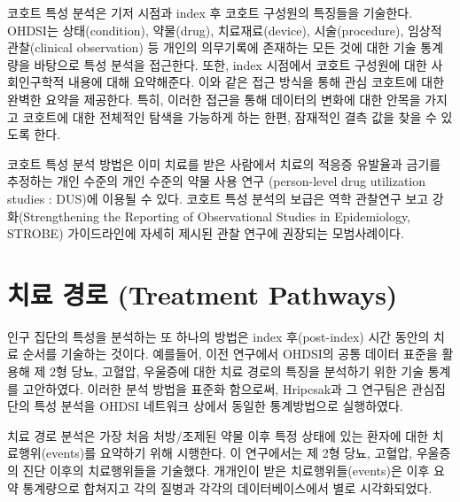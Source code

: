 \documentclass[11pt]{book}
\theoremstyle{definition}
\theoremstyle{definition}
\theoremstyle{definition}
\theoremstyle{remark}
\begin{document}
코호트 특성 분석은 기저 시점과 index 후 코호트 구성원의 특징들을
기술한다. OHDSI는 상태(condition), 약물(drug), 치료재료(device),
시술(procedure), 임상적 관찰(clinical observation) 등 개인의 의무기록에
존재하는 모든 것에 대한 기술 통계량을 바탕으로 특성 분석을 접근한다.
또한, index 시점에서 코호트 구성원에 대한 사회인구학적 내용에 대해
요약해준다. 이와 같은 접근 방식을 통해 관심 코호트에 대한 완벽한 요약을
제공한다. 특히, 이러한 접근을 통해 데이터의 변화에 대한 안목을 가지고
코호트에 대한 전체적인 탐색을 가능하게 하는 한편, 잠재적인 결측 값을
찾을 수 있도록 한다.

코호트 특성 분석 방법은 이미 치료를 받은 사람에서 치료의 적응증 유발율과
금기를 추정하는 개인 수준의 개인 수준의 약물 사용 연구 (person-level
drug utilization studies : DUS)에 이용될 수 있다. 코호트 특성 분석의
보급은 역학 관찰연구 보고 강화(Strengthening the Reporting of
Observational Studies in Epidemiology, STROBE) 가이드라인에 자세히
제시된 관찰 연구에 권장되는 모범사례이다. \citep{VONELM2008344}

\section{치료 경로 (Treatment Pathways)}\label{--treatment-pathways}

인구 집단의 특성을 분석하는 또 하나의 방법은 index 후(post-index) 시간
동안의 치료 순서를 기술하는 것이다. 예를들어, 이전
연구\citep{Hripcsak7329}에서 OHDSI의 공통 데이터 표준을 활용해 제 2형
당뇨, 고혈압, 우울증에 대한 치료 경로의 특징을 분석하기 위한 기술 통계를
고안하였다. 이러한 분석 방법을 표준화 함으로써, Hripcsak과 그 연구팀은
관심집단의 특성 분석을 OHDSI 네트워크 상에서 동일한 통계방법으로
실행하였다. 

치료 경로 분석은 가장 처음 처방/조제된 약물 이후 특정 상태에 있는 환자에
대한 치료행위(events)를 요약하기 위해 시행한다. 이 연구에서는 제 2형
당뇨, 고혈압, 우울증의 진단 이후의 치료행위들을 기술했다. 개개인이 받은
치료행위들(events)은 이후 요약 통계량으로 합쳐지고 각의 질병과 각각의
데이터베이스에서 별로 시각화되었다.
\end{document}
